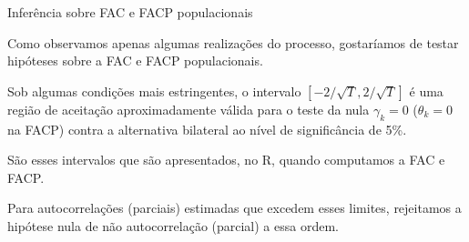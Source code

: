 \documentclass[11pt]{beamer}
\newenvironment{halfwideitemize}{\itemize\addtolength{\itemsep}{0.5em}}{\enditemize}
\begin{document}
\begin{frame}{Inferência sobre FAC e FACP populacionais}
	\begin{halfwideitemize}
				\item Como observamos apenas algumas realizações do processo, gostaríamos de testar hipóteses sobre a FAC e FACP populacionais.
		\item Sob algumas condições mais estringentes, o intervalo $[-2/\sqrt{T}, 2/\sqrt{T}]$ é uma região de aceitação aproximadamente válida para o teste da nula $\gamma_k=0$ ($\theta_k =0$ na FACP)  contra a alternativa bilateral ao nível de significância de 5\%.
		\begin{halfwideitemize}
			\item São esses intervalos que são apresentados, no R, quando computamos a FAC e FACP.
			\item Para autocorrelações (parciais) estimadas que excedem esses limites, rejeitamos a hipótese nula de não autocorrelação (parcial) a essa ordem.
		\end{halfwideitemize}
	
	\end{halfwideitemize}

\end{frame}
\end{document}
